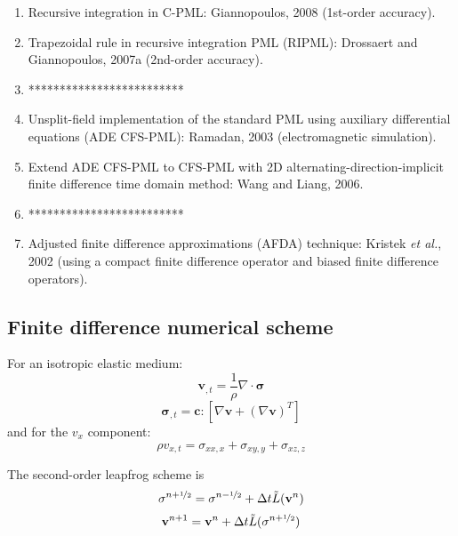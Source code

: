 \documentclass{article}
\newcommand{\sline}{*************************}
\newcommand{\mbf}[1]{\mathbf{#1}}
\newcommand{\etal}{\textit{et al.}}
\begin{document}
\begin{enumerate}[\hspace{10mm}*]
  \item Recursive integration in C-PML: Giannopoulos, 2008 (1st-order accuracy).
  \item Trapezoidal rule in recursive integration PML (RIPML): Drossaert and Giannopoulos, 2007a (2nd-order accuracy).
  \item \sline
  \item Unsplit-field implementation of the standard PML using auxiliary differential equations (ADE CFS-PML): Ramadan, 2003 (electromagnetic simulation).
  \item Extend ADE CFS-PML to CFS-PML with 2D alternating-direction-implicit finite difference time domain method: Wang and Liang, 2006.
  \item \sline 
  \item Adjusted finite difference approximations (AFDA) technique: Kristek \etal, 2002 (using a compact finite difference operator and biased finite difference operators).
\end{enumerate}\par
\subsection{Finite difference numerical scheme}
For an isotropic elastic medium:
\[ \mbf v_{,t}=\frac{1}{\rho}\nabla\cdot\mbf\sigma \]
\[ \mbf\sigma_{,t}=\mbf c:[\nabla\mbf v+(\nabla\mbf v)^T] \]
and for the $v_x$ component:
\[ \rho v_{x,t}=\sigma_{xx,x}+\sigma_{xy,y}+\sigma_{xz,z} \]\par
The second-order leapfrog scheme is
\[ \mbf\sigma^{n+\nicefrac{1}{2}}=\mbf\sigma^{n-\nicefrac{1}{2}}+\Delta t\tilde{L}(\mbf v^n) \]
\[ \mbf v^{n+1}=\mbf v^n+\Delta t\tilde{L}(\mbf\sigma^{n+\nicefrac{1}{2}}) \]\par
\end{document}
